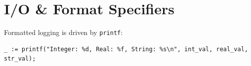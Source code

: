 \section{I/O \& Format Specifiers}
Formatted logging is driven by \texttt{printf}:
\begin{lstlisting}[caption={\texttt{printf} Specifiers in Sisal-2026}]
_ := printf("Integer: %d, Real: %f, String: %s\n", int_val, real_val, str_val);
\end{lstlisting}

